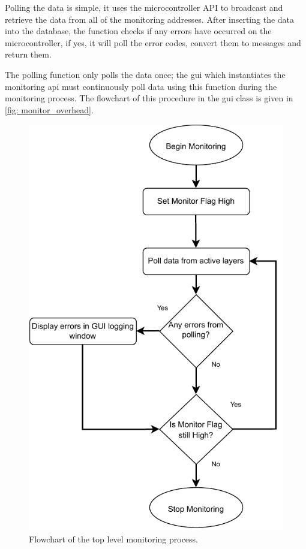 \documentclass[main.tex]{subfiles}
\begin{document}
Polling the data is simple, it uses the microcontroller API to broadcast and retrieve the data from all of the monitoring addresses. After inserting the data into the database, the function checks if any errors have occurred on the microcontroller, if yes, it will poll the error codes, convert them to messages and return them.

The polling function only polls the data once; the \gls{gui} which instantiates the monitoring \gls{api} must continuously poll data using this function during the monitoring process. The flowchart of this procedure in the \gls{gui} class is given in \autoref{fig: monitor_overhead}.

\begin{figure}[!ht]
    \centering
    \includegraphics[scale=0.9]{images/polling_overhead.pdf}
    \caption{Flowchart of the top level monitoring process.}
    \label{fig: monitor_overhead}
\end{figure}
\FloatBarrier
\end{document}
